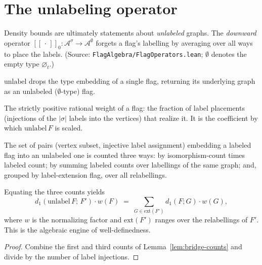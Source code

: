 \chapter{The unlabeling operator}
\label{chap:downward}

Density bounds are ultimately statements about \emph{unlabeled} graphs. The
\emph{downward} operator $[\![\,\cdot\,]\!]_0 : \mathcal{A}^\sigma \to
\mathcal{A}^\emptyset$ forgets a flag's labelling by averaging over all ways to
place the labels. (Source: \texttt{FlagAlgebra/FlagOperators.lean}; $\emptyset$
denotes the empty type $\varnothing_t$.)

\begin{definition}[Unlabel]
  \label{def:unlabel}
  \leanok
  $\mathrm{unlabel}$ drops the type embedding of a single flag, returning its
  underlying graph as an unlabeled ($\emptyset$-type) flag.
\end{definition}

\begin{definition}
  \label{def:downward-factor}
  \leanok
  The strictly positive rational weight of a flag: the fraction of label
  placements (injections of the $|\sigma|$ labels into the vertices) that realize
  it. It is the coefficient by which $\mathrm{unlabel}\,F$ is scaled.
\end{definition}

\begin{lemma}
  \label{lem:bridge-counts}
  \leanok
  The set of pairs (vertex subset, injective label assignment) embedding a
  labeled flag into an unlabeled one is counted three ways: by
  isomorphism-count times labeled count; by summing labeled counts over labellings
  of the same graph; and, grouped by label-extension flag, over all relabellings.
\end{lemma}

\begin{theorem}
  \label{thm:counting-identity}
  \leanok
  Equating the three counts yields
  \[ d_1(\mathrm{unlabel}\,F;\,F')\cdot w(F)
     \;=\; \sum_{G \in \mathrm{ext}(F')} d_1(F;G)\cdot w(G), \]
  where $w$ is the normalizing factor and $\mathrm{ext}(F')$ ranges over the
  relabellings of $F'$. This is the algebraic engine of well-definedness.
\end{theorem}
\begin{proof}\leanok
  Combine the first and third counts of Lemma~\ref{lem:bridge-counts} and divide
  by the number of label injections.
\end{proof}

